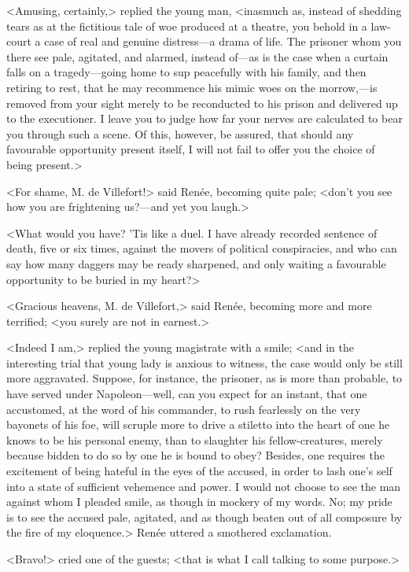  <Amusing, certainly,> replied the young man, <inasmuch as, instead of shedding tears as at the fictitious tale of woe produced at a theatre, you behold in a law-court a case of real and genuine distress—a drama of life. The prisoner whom you there see pale, agitated, and alarmed, instead of—as is the case when a curtain falls on a tragedy—going home to sup peacefully with his family, and then retiring to rest, that he may recommence his mimic woes on the morrow,—is removed from your sight merely to be reconducted to his prison and delivered up to the executioner. I leave you to judge how far your nerves are calculated to bear you through such a scene. Of this, however, be assured, that should any favourable opportunity present itself, I will not fail to offer you the choice of being present.> 

 <For shame, M. de Villefort!> said Renée, becoming quite pale; <don't you see how you are frightening us?—and yet you laugh.> 

 <What would you have? 'Tis like a duel. I have already recorded sentence of death, five or six times, against the movers of political conspiracies, and who can say how many daggers may be ready sharpened, and only waiting a favourable opportunity to be buried in my heart?> 

 <Gracious heavens, M. de Villefort,> said Renée, becoming more and more terrified; <you surely are not in earnest.> 

 <Indeed I am,> replied the young magistrate with a smile; <and in the interesting trial that young lady is anxious to witness, the case would only be still more aggravated. Suppose, for instance, the prisoner, as is more than probable, to have served under Napoleon—well, can you expect for an instant, that one accustomed, at the word of his commander, to rush fearlessly on the very bayonets of his foe, will scruple more to drive a stiletto into the heart of one he knows to be his personal enemy, than to slaughter his fellow-creatures, merely because bidden to do so by one he is bound to obey? Besides, one requires the excitement of being hateful in the eyes of the accused, in order to lash one's self into a state of sufficient vehemence and power. I would not choose to see the man against whom I pleaded smile, as though in mockery of my words. No; my pride is to see the accused pale, agitated, and as though beaten out of all composure by the fire of my eloquence.> Renée uttered a smothered exclamation. 

 <Bravo!> cried one of the guests; <that is what I call talking to some purpose.> 

